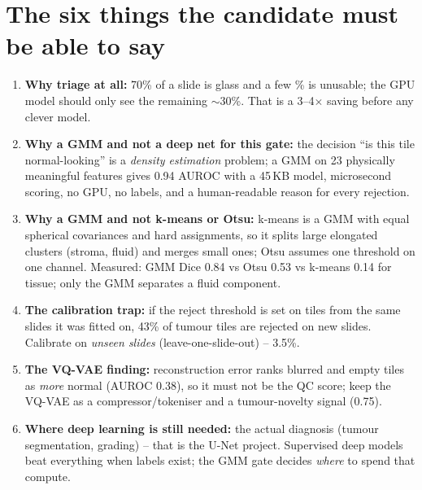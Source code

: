 \section{The six things the candidate must be able to say}
\begin{enumerate}
\item \textbf{Why triage at all:} 70\% of a slide is glass and a few \% is unusable; the GPU model should only see the
remaining $\sim$30\%. That is a 3--4$\times$ saving before any clever model.
\item \textbf{Why a GMM and not a deep net for this gate:} the decision ``is this tile normal-looking'' is a
\emph{density estimation} problem; a GMM on 23 physically meaningful features gives 0.94 AUROC with a 45\,KB model,
microsecond scoring, no GPU, no labels, and a human-readable reason for every rejection.
\item \textbf{Why a GMM and not k-means or Otsu:} k-means is a GMM with equal spherical covariances and hard
assignments, so it splits large elongated clusters (stroma, fluid) and merges small ones; Otsu assumes one
threshold on one channel. Measured: GMM Dice 0.84 vs Otsu 0.53 vs k-means 0.14 for tissue; only the GMM separates
a fluid component.
\item \textbf{The calibration trap:} if the reject threshold is set on tiles from the same slides it was fitted on,
43\% of tumour tiles are rejected on new slides. Calibrate on \emph{unseen slides} (leave-one-slide-out) -- 3.5\%.
\item \textbf{The VQ-VAE finding:} reconstruction error ranks blurred and empty tiles as \emph{more} normal (AUROC 0.38),
so it must not be the QC score; keep the VQ-VAE as a compressor/tokeniser and a tumour-novelty signal (0.75).
\item \textbf{Where deep learning is still needed:} the actual diagnosis (tumour segmentation, grading) -- that is
the U-Net project. Supervised deep models beat everything when labels exist; the GMM gate decides \emph{where} to
spend that compute.
\end{enumerate}

